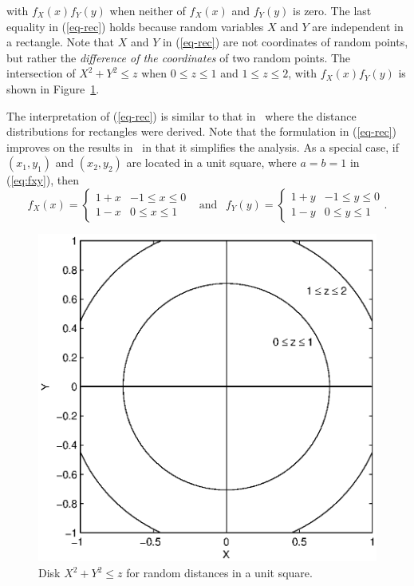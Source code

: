 \documentclass[12pt,draftclsnofoot,onecolumn]{IEEEtran}
\begin{document}
with $f_X(x)f_Y(y)$ when neither of $f_X(x)$ and $f_Y(y)$ is zero.
The last equality in (\ref{eq-rec}) holds because random variables
$X$ and $Y$ are independent in a rectangle. Note that $X$ and $Y$ in (\ref{eq-rec})
are not coordinates of random points, but rather the \textit{difference of the coordinates} 
of two random points. The intersection of  $X^2+Y^2\leq z$ when $0\leq z \leq1$ 
and $1\leq z \leq 2$, with $f_X(x)f_Y(y)$ is shown in Figure~\ref{fig:square}.
%

The interpretation of (\ref{eq-rec}) is similar to that in~\cite{ghosh1943distribution, 
ghosh1943random} where the distance distributions for rectangles were derived.
Note that the formulation in (\ref{eq-rec}) improves on the results
in~\cite{zhuang2011random, zhuang2012geometrical} in that it simplifies the analysis.
As a special case, if $(x_1, y_1)$ and $(x_2, y_2)$ are located
in a unit square, where $a=b=1$ in (\ref{eq:fxy}), then
\begin{equation}\label{eq:fxy-sqr}
  f_X(x)=\left\{
    \begin{array}{lr}
      1+x & -1\leq x \leq 0 \\
      1-x & 0 \leq x \leq 1
    \end{array}
  \right.
  ~~\mbox{ and }~~ f_Y(y)=\left\{
    \begin{array}{lr}
      1+y & -1\leq y \leq 0 \\
      1-y & 0 \leq y \leq 1
    \end{array}
  \right..
\end{equation}

\begin{figure}
  \centering
  \includegraphics[width=0.5\columnwidth]{fig/square_within}
  \caption{Disk $X^2+Y^2 \leq z$ for random distances in a unit square.}
  \label{fig:square}
\end{figure}
\end{document}
